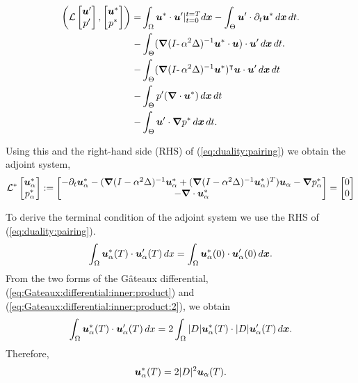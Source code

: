 \begin{subequations}
\begin{align}
\left(\L\begin{bmatrix}
\u'\\
p'
\end{bmatrix}, \begin{bmatrix}
\u^*\\
p^*
\end{bmatrix} \right) =& \int_{\Omega}\u^* \cdot \u'|_{t=0}^{t=T} d\x - \int_{\Theta} \u'\cdot \partial_t \u^* \dxdt. \\
-& \int_{\Theta} (\bn(I\text{-}\,\alpha^2\Delta)^{-1}\u^*\cdot \u)\cdot \u' \dxdt. \\
-& \int_{\Theta} (\bn(I\text{-}\,\alpha^2\Delta)^{-1}\u^*)^\intercal \u \cdot \u' \dxdt \\
-& \int_{\Theta} p' (\bn\cdot \u^*) \dxdt \\ 
-& \int_{\Theta} \u' \cdot \bn p^* \dxdt.
\end{align}
\end{subequations}

\noindent Using this and the right-hand side (RHS) of (\ref{eq:duality:pairing}) we obtain the adjoint system,
$$\L^*\begin{bmatrix}
\usa\\
\psa
\end{bmatrix} := \begin{bmatrix}
-\partial_t\usa-(\bn (I-\alpha^2\Delta)^{-1}\usa + (\bn (I-\alpha^2\Delta)^{-1}\usa)^T)\ua-\bn \psa \\
-\bn \cdot \usa
\end{bmatrix} = \begin{bmatrix}
0\\
0
\end{bmatrix}$$

\noindent To derive the terminal condition of the adjoint system we use the RHS of (\ref{eq:duality:pairing}).
$$\int_\Omega \usa(T) \cdot \upa(T) \,dx = \int_\Omega \usa(0) \cdot \upa(0) \,d\x.$$
From the two forms of the G\^{a}teaux differential, (\ref{eq:Gateaux:differential:inner:product}) and (\ref{eq:Gateaux:differential:inner:product:2}), we obtain 
$$\int_\Omega \usa(T) \cdot \upa(T) \,dx = 2\int_\Omega |D|\usa(T) \cdot |D|\upa(T) \,d\x.$$
Therefore,
$$\usa(T) = 2|D|^2\ua(T).$$
